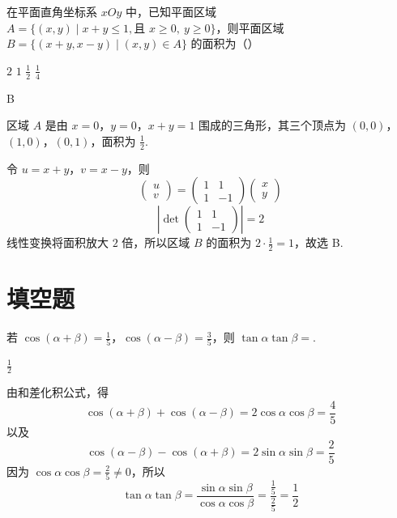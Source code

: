 \begin{problem}
在平面直角坐标系 \(xOy\) 中，已知平面区域 \(A = \{(x, y) \mid x + y \leqslant 1,\text{且 }x \geqslant 0,\ y \geqslant 0\}\)，则平面区域 \(B = \{(x + y, x - y) \mid (x, y) \in A\}\) 的面积为（\quad）

\choices
    {\(2\)}
    {\(1\)}
    {\(\frac{1}{2}\)}
    {\(\frac{1}{4}\)}
\end{problem}

\begin{answer}
B
\end{answer}

\begin{solution}
区域 \(A\) 是由 \(x=0\)，\(y=0\)，\(x+y=1\) 围成的三角形，其三个顶点为 \((0,0)\)，\((1,0)\)，\((0,1)\)，面积为 \(\frac{1}{2}\).

令 \(u=x+y\)，\(v=x-y\)，则
\[
\begin{pmatrix}u\\v\end{pmatrix}
=\begin{pmatrix}1&1\\1&-1\end{pmatrix}
\begin{pmatrix}x\\y\end{pmatrix}
\]
\[
\left|\det\begin{pmatrix}1&1\\1&-1\end{pmatrix}\right|=2
\]
线性变换将面积放大 \(2\) 倍，所以区域 \(B\) 的面积为 \(2\cdot\frac{1}{2}=1\)，故选 B.
\end{solution}

\section{填空题}

\begin{problem}
若 \(\cos(\alpha+\beta)=\frac{1}{5}\)，\(\cos(\alpha-\beta)=\frac{3}{5}\)，则 \(\tan\alpha\tan\beta=\)\fillinblank{}.
\end{problem}

\begin{answer}
\(\frac{1}{2}\)
\end{answer}

\begin{solution}
由和差化积公式，得
\[
\cos(\alpha+\beta)+\cos(\alpha-\beta)=2\cos\alpha\cos\beta=\frac{4}{5}
\]
以及
\[
\cos(\alpha-\beta)-\cos(\alpha+\beta)=2\sin\alpha\sin\beta=\frac{2}{5}
\]
因为 \(\cos\alpha\cos\beta=\frac{2}{5}\neq0\)，所以
\[
\tan\alpha\tan\beta
=\frac{\sin\alpha\sin\beta}{\cos\alpha\cos\beta}
=\frac{\frac{1}{5}}{\frac{2}{5}}
=\frac{1}{2}
\]
\end{solution}

